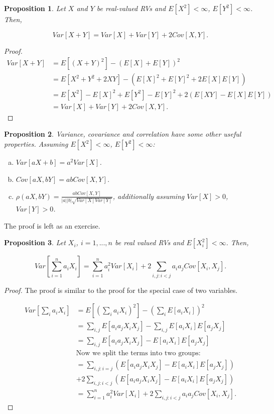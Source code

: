 \documentclass{book}
\theoremstyle{plain}%
\newtheorem{proposition}{Proposition}[section]
\theoremstyle{definition}
\begin{document}
\begin{proposition}
Let $X$ and $Y$ be real-valued RVs and $E[X^2] < \infty$, $E[Y^2] < \infty$. Then,

$$Var[X+Y] = Var[X] + Var[Y] + 2Cov[X,Y].$$
\end{proposition}

\begin{proof}
\begin{align*}
Var[X+Y] &= E[(X +Y)^2] - (E[X]+ E[Y])^2  \\
&= E[X^2 + Y^2 + 2XY] - (E[X]^2 + E[Y]^2 + 2E[X]E[Y])\\
&= E[X^2] - E[X]^2 + E[Y^2] - E[Y]^2 + 2(E[XY] - E[X]E[Y])\\
&= Var[X] + Var[Y] + 2Cov[X,Y].
\end{align*}
\end{proof}

\begin{proposition}
Variance, covariance and correlation have some other useful properties. Assuming $E[X^2] < \infty$, $E[Y^2] < \infty$:

\begin{enumerate}[(a)]
\item $Var[aX + b] = a^2Var[X]$.
\item $Cov[aX, bY] = abCov[X,Y]$.
\item $\rho(aX, bY) = \frac{abCov[X,Y]}{|a||b|\sqrt{Var[X]Var[Y]}}$, additionally assuming $Var[X] > 0$, $Var[Y] > 0$.
\end{enumerate}\label{prop:variance2}
\end{proposition}

The proof is left as an exercise.

\begin{proposition}
Let $X_i$, $i = 1,...,n$ be real valued RVs and $E[X_i^2] < \infty$. Then,

$$Var[\sum_{i=1}^n a_iX_i] = \sum_{i=1}^n a_i^2Var[X_i]+ 2\sum_{i,j:i<j}a_ia_jCov[X_i,X_j].$$
\end{proposition}

\begin{proof}
The proof is similar to the proof for the special case of two variables.

\begin{align*}
Var[\sum_{i} a_iX_i] &= E[(\sum_{i}a_iX_i)^2] - (\sum_i E[a_iX_i])^2  \\
&= \sum_{i,j} E[a_ia_jX_iX_j] - \sum_{i,j} E[a_iX_i]E[a_jX_j]\\
&= \sum_{i,j} E[a_ia_jX_iX_j] - E[a_iX_i]E[a_jX_j]\\
&\text{Now we split the terms into two groups:} \\
&= \sum_{i,j: i = j} (E[a_ia_jX_iX_j] - E[a_iX_i]E[a_jX_j]) \\ &+ 2 \sum_{i,j: i < j} (E[a_ia_jX_iX_j] - E[a_iX_i]E[a_jX_j])\\
&= \sum_{i=1}^n a_i^2Var[X_i]+ 2\sum_{i,j:i<j}a_ia_jCov[X_i,X_j].
\end{align*}
\end{proof}
\end{document}
